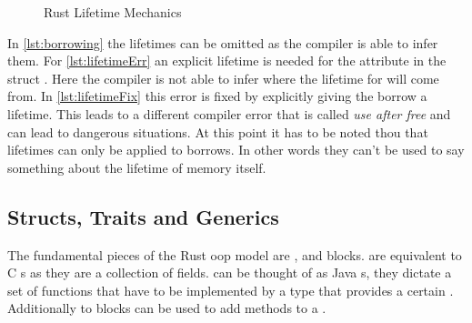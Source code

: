 \documentclass[thesis]{subfiles}
\begin{document}
    \newsavebox{\lifetimeFixBox}
    \begin{lrbox}{\lifetimeFixBox}%
      \begin{minipage}{.45\linewidth}
        
      \end{minipage}
    \end{lrbox}

    \begin{figure}[ht]
      \captionsetup{type=lstlisting}
       \hfill%
      \caption{Rust Lifetime Mechanics}\label{lst:lifetime}
    \end{figure}

    In \autoref{lst:borrowing} the lifetimes can be omitted as the compiler is able to infer them.
    For \autoref{lst:lifetimeErr} an explicit lifetime is needed for the attribute  in the struct .
    Here the compiler is not able to infer where the lifetime for  will come from.
    In \autoref{lst:lifetimeFix} this error is fixed by explicitly giving the borrow a lifetime.
    This leads to a different compiler error that is called \emph{use after free} and can lead to dangerous situations.
    At this point it has to be noted thou that lifetimes can only be applied to borrows.
    In other words they can't be used to say something about the lifetime of memory itself.

  \subsection{Structs, Traits and Generics}\label{ssec:stg}
    The fundamental pieces of the Rust \gls{oop} model are \structs, \traits and  blocks.
    \structs are equivalent to C s as they are a collection of fields.
    \traits can be thought of as Java s, they dictate a set of functions that have to be implemented by a type that provides a certain \trait.
    Additionally to \traits {} blocks can be used to add methods to a \struct.
\end{document}
